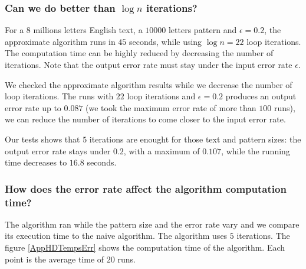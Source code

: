 \documentclass[preprint,12pt]{elsarticle}
\begin{document}





\subsubsection*{Can we do better than $\log n$ iterations?}
\label{AppIter}

For a $8$ millions letters English text, a $10 000$ letters pattern and $\epsilon = 0.2$,
the approximate algorithm runs in  $45$ seconds,
while using $\log n = 22$ loop iterations.
The computation time can be highly reduced by decreasing the number of iterations.
Note that the output error rate must stay under the input error rate $\epsilon$.

We checked the approximate algorithm results
while we decrease the number of loop iterations. %
The runs with $22$ loop iterations and $\epsilon = 0.2$
produces an output error rate up to $0.087$
(we took the maximum error rate of more than $100$ runs),
we can reduce the number of iterations to come closer to the input error rate.

Our tests shows that $5$ iterations are enought
for those text and pattern sizes: the output error rate stays under $0.2$,
with a maximum of $0.107$, %
while the running time decreases to $16.8$ seconds.

 

\subsubsection*{How does the error rate affect the algorithm computation time?}

The algorithm ran while the pattern size and the error rate vary
and we compare its execution time to the naive algorithm.
The algorithm uses $5$ iterations.
The figure \ref{AppHDTempsErr} shows the computation time of the algorithm.
Each point is the average time of $20$ runs.
\end{document}
